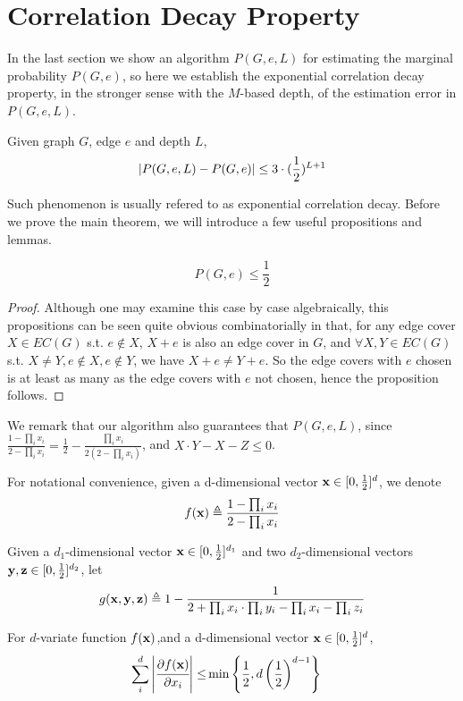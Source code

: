 \section{Correlation Decay Property}

In the last section we show an algorithm $P(G,e,L)$ for estimating the marginal probability $P(G,e)$,
so here we establish the exponential correlation decay property, in the stronger sense with the 
$M$-based depth,
of the estimation error in $P(G,e,L)$.%

\begin{Thm}
	\label{cd-main-theorem}
	Given graph $G$, edge $e$ and depth $L$,
	\[\left\vert P(G,e,L) - P(G,e)\right\vert \leq 3\cdot(\frac{1}{2})^{L+1}\]
\end{Thm}

Such phenomenon is usually refered to as exponential correlation decay. Before we prove the main theorem, we will introduce a few useful propositions and lemmas.

\begin{Prop}
	\[P(G, e) \leq \frac{1}{2}\]
\end{Prop}

\begin{proof}
	Although one may examine this case by case algebraically, this propositions can be seen quite obvious combinatorially in that, for any edge cover $X \in EC(G)$ s.t. $e \notin X$, $X+e$ is also an edge cover in $G$, and $\forall X,Y \in EC(G)$ s.t. $X \neq Y, e \notin X, e\notin Y$, we have $X+e \neq Y+e$. So the edge covers with $e$ chosen is at least as many as the edge covers with $e$ not chosen, hence the proposition follows.
\end{proof}

We remark that our algorithm also guarantees that $P(G,e,L)$, since $\frac{1 - \prod_i x_i}{2 - \prod_i x_i} = \frac{1}{2} - \frac{\prod_i x_i}{2(2 - \prod_i x_i)}$, and $X\cdot Y - X - Z \leq 0$.

For notational convenience, given a d-dimensional vector ${\bf x} \in [0, \frac{1}{2}]^d$, we denote
\[ f({\bf x}) \triangleq \frac{1- \prod_i x_i}{2 - \prod_i x_i}\]

Given a $d_1$-dimensional vector ${\bf x} \in [0, \frac{1}{2}]^{d_1}$ and two $d_2$-dimensional vectors ${\bf y,z} \in [0, \frac{1}{2}]^{d_2}$, let
\[ g({\bf x,y,z}) \triangleq  1- \frac{1}{2+\prod_i x_i \cdot \prod_i y_i - \prod_i x_i - \prod_i z_i} \]


	\begin{Lem}
		For $d$-variate function $f({\bf x})$,and a d-dimensional vector ${\bf x} \in [0, \frac{1}{2}]^d$,
		\begin{align*}
			\sum_i^d \left\vert\cfrac{\partial f({\bf x})}{\partial x_i}\right\vert \leq & \min{\left\{\frac{1}{2}, d \left( \frac{1}{2} \right)^{d-1}\right\}}
		\end{align*}
	\end{Lem}

